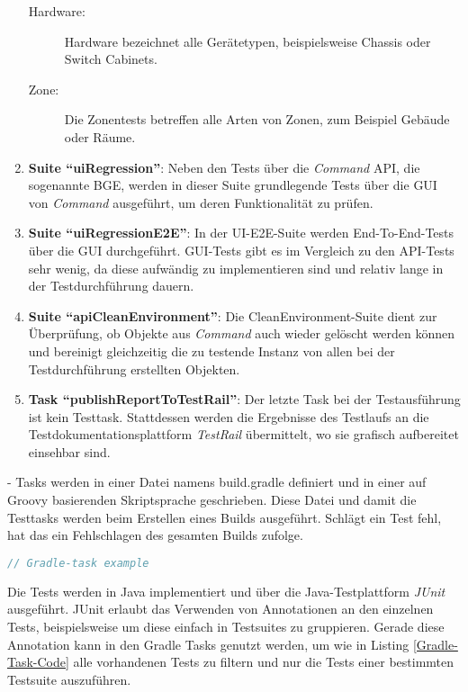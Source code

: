 \begin{enumerate}
\begin{description}
        \item[Hardware:] Hardware bezeichnet alle Gerätetypen, beispielsweise Chassis oder Switch Cabinets.
        \item[Zone:] Die Zonentests betreffen alle Arten von Zonen, zum Beispiel Gebäude oder Räume.
    \end{description}
    \item \textbf{Suite \enquote{uiRegression}}: Neben den Tests über die \textit{Command} \ac{API}, die sogenannte \ac{BGE}, werden in dieser Suite grundlegende Tests über die \ac{GUI} von \textit{Command} ausgeführt, um deren Funktionalität zu prüfen.
    \item \textbf{Suite \enquote{uiRegressionE2E}}: In der UI-E2E-Suite werden End-To-End-Tests über die \ac{GUI} durchgeführt. \ac{GUI}-Tests gibt es im Vergleich zu den \ac{API}-Tests sehr wenig, da diese aufwändig zu implementieren sind und relativ lange in der Testdurchführung dauern.
    \item \textbf{Suite \enquote{apiCleanEnvironment}}: Die CleanEnvironment-Suite dient zur Überprüfung, ob Objekte aus \textit{Command} auch wieder gelöscht werden können und bereinigt gleichzeitig die zu testende Instanz von allen bei der Testdurchführung erstellten Objekten.
    \item \textbf{Task \enquote{publishReportToTestRail}}: Der letzte Task bei der Testausführung ist kein Testtask. Stattdessen werden die Ergebnisse des Testlaufs an die Testdokumentationsplattform \textit{TestRail} übermittelt, wo sie grafisch aufbereitet einsehbar sind.
\end{enumerate}

- Tasks werden in einer Datei namens build.gradle definiert und in einer auf Groovy basierenden Skriptsprache geschrieben. Diese Datei und damit die Testtasks werden beim Erstellen eines Builds ausgeführt. Schlägt ein Test fehl, hat das ein Fehlschlagen des gesamten Builds zufolge.

\begin{lstlisting}[caption=Ein Beispiel eines Gradle Tasks zum Ausführen einer Testsuite, label=Gradle-Task-Code, language=Groovy]
    // Gradle-task example
\end{lstlisting}

Die Tests werden in Java implementiert und über die Java-Testplattform \textit{JUnit} ausgeführt. JUnit erlaubt das Verwenden von Annotationen an den einzelnen Tests, beispielsweise um diese einfach in Testsuites zu gruppieren. Gerade diese Annotation kann in den Gradle Tasks genutzt werden, um wie in Listing \ref{Gradle-Task-Code} alle vorhandenen Tests zu filtern und nur die Tests einer bestimmten Testsuite auszuführen. \cite{junit:2021}

